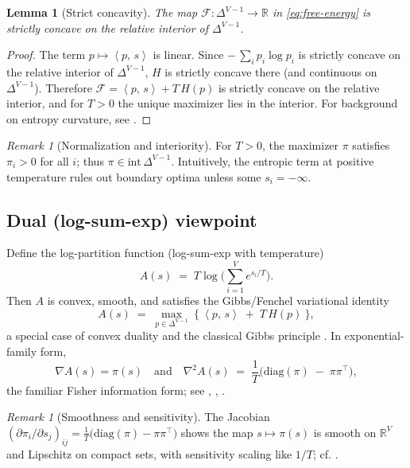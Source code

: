 \documentclass[11pt,reqno]{article}
\numberwithin{equation}{section}
\theoremstyle{plain}
\newtheorem{lemma}[theorem]{Lemma}
\theoremstyle{definition}
\theoremstyle{remark}
\newtheorem{remark}[theorem]{Remark}
\newcommand{\R}{\mathbb{R}}
\newcommand{\1}{\mathbbm{1}}
\newcommand{\ip}[2]{\left\langle #1,\, #2 \right\rangle}
\newcommand{\Hent}{H}
\newcommand{\simplex}{\Delta^{V-1}}
\begin{document}
\begin{lemma}[Strict concavity]\label{lem:strict-concavity}
The map $\mathcal{F}:\simplex\to\R$ in \eqref{eq:free-energy} is strictly concave on the relative interior of $\simplex$.
\end{lemma}

\begin{proof}
The term $p\mapsto \ip{p}{s}$ is linear. Since $-\,\sum_i p_i\log p_i$ is strictly concave on the relative interior of $\simplex$, $\Hent$ is strictly concave there (and continuous on $\simplex$). Therefore $\mathcal{F}=\ip{p}{s}+T\,\Hent(p)$ is strictly concave on the relative interior, and for $T>0$ the unique maximizer lies in the interior. For background on entropy curvature, see \citet[§3.1.4]{boyd2004convex}.
\end{proof}

\begin{remark}[Normalization and interiority]\label{rem:interior}
For $T>0$, the maximizer $\pi$ satisfies $\pi_i>0$ for all $i$; thus $\pi\in\mathrm{int}\,\simplex$. Intuitively, the entropic term at positive temperature rules out boundary optima unless some $s_i=-\infty$.
\end{remark}

\subsection{Dual (log-sum-exp) viewpoint}
Define the log-partition function (log-sum-exp with temperature)
\begin{equation}\label{eq:logZ}
A(s)\;=\;T\log\!\Big(\sum_{i=1}^V e^{s_i/T}\Big).
\end{equation}
Then $A$ is convex, smooth, and satisfies the Gibbs/Fenchel variational identity
\begin{equation}\label{eq:duality}
A(s)\;=\;\max_{p\in\simplex}\ \Big\{\ \ip{p}{s} \;+\; T\,\Hent(p)\ \Big\},
\end{equation}
a special case of convex duality \citep[cf.][]{rockafellar1970convex} and the classical Gibbs principle \citep{jaynes1957information,cover2006elements}. In exponential-family form,
\[
\nabla A(s)=\pi(s)\quad\text{and}\quad
\nabla^2 A(s)\;=\;\frac{1}{T}\Big(\mathrm{diag}(\pi)\;-\;\pi\pi^\top\Big),
\]
the familiar Fisher information form; see \citet[§3]{wainwright2008graphical}, \citet[§8.3]{murphy2012ml}, \citet[§4.3]{bishop2006pattern}.

\begin{remark}[Smoothness and sensitivity]
The Jacobian $(\partial \pi_i/\partial s_j)_{ij}=\frac{1}{T}\big(\mathrm{diag}(\pi)-\pi\pi^\top\big)$ shows the map $s\mapsto \pi(s)$ is smooth on $\R^V$ and Lipschitz on compact sets, with sensitivity scaling like $1/T$; cf. \citet[§8.3]{murphy2012ml}.
\end{remark}
\end{document}
